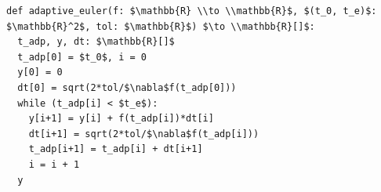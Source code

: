 \documentclass[border=10pt]{standalone}
\begin{document}
\begin{lstlisting}
def adaptive_euler(f: $\mathbb{R} \\to \\mathbb{R}$, $(t_0, t_e)$: $\mathbb{R}^2$, tol: $\mathbb{R}$) $\to \\mathbb{R}[]$:
  t_adp, y, dt: $\mathbb{R}[]$
  t_adp[0] = $t_0$, i = 0
  y[0] = 0
  dt[0] = sqrt(2*tol/$\nabla$f(t_adp[0]))
  while (t_adp[i] < $t_e$):
    y[i+1] = y[i] + f(t_adp[i])*dt[i]
    dt[i+1] = sqrt(2*tol/$\nabla$f(t_adp[i]))
    t_adp[i+1] = t_adp[i] + dt[i+1]
    i = i + 1
  y
\end{lstlisting}
\end{document}
